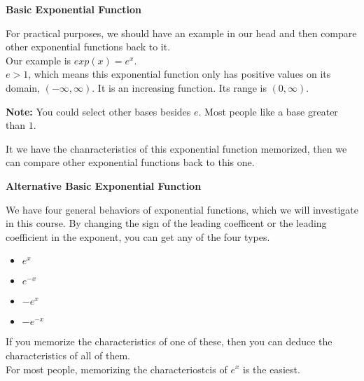 \documentclass{ximera}
\begin{document}
\begin{idea} \textbf{\textcolor{red!80!black}{Basic Exponential Function}}


For practical purposes, we should have an example in our head and then compare other exponential functions back to it. \\

Our example is  $exp(x) = e^x$. \\


$e > 1$, which means this exponential function only has positive values on its domain, $(-\infty, \infty)$.  It is an increasing function. Its range is $(0, \infty)$.

\textbf{Note:} You could select other bases besides $e$.  Most people like a base greater than $1$.


\end{idea}

It we have the chanracteristics of this exponential function memorized, then we can compare other exponential functions back to this one.





\begin{idea} \textbf{\textcolor{red!80!black}{Alternative Basic Exponential Function}}


We have four general behaviors of exponential functions, which we will investigate in this course. By changing the sign of the leading coefficent or the leading coefficient in the exponent, you can get any of the four  types.  


\begin{itemize}
\item $e^x$
\item $e^{-x}$
\item $-e^x$
\item $-e^{-x}$
\end{itemize}


If you memorize the characteristics of one of these, then you can deduce the characteristics of all of them. \\

For most people, memorizing the characteriostcis of $e^x$ is the easiest.


\end{idea}
\end{document}
